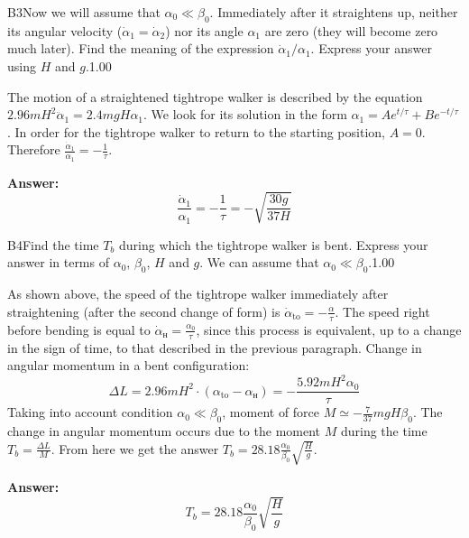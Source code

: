 \documentclass[11pt,a4paper]{article}
\begin{document}
\begin{solcard}{B3}{Now we will assume that $\alpha_0\ll{\beta_0}$. Immediately after it straightens up, neither its angular velocity ($\dot{\alpha}_1=\dot{\alpha}_2$) nor its angle $\alpha_1$ are zero (they will become zero much later). Find the meaning of the expression $\dot{\alpha}_1/\alpha_1$. Express your answer using $H$ and $g$.}{1.00}

The motion of a straightened tightrope walker is described by the equation $2.96mH^2 \ddot{\alpha}_1=2.4mgH\alpha_1$. We look for its solution in the form $\alpha_1=Ae^{t/\tau}+Be^{-t/\tau}$. In order for the tightrope walker to return to the starting position, $A=0$. Therefore $\frac{\dot{\alpha}_1}{\alpha_1} = - \frac{1}{\tau}$.

\par\smallskip\noindent\textbf{Answer:} \[\frac{\dot{\alpha}_1}{\alpha_1} = - \frac{1}{\tau}=-\sqrt{\frac{30g}{37H}}\]
\end{solcard}

\begin{solcard}{B4}{Find the time $T_b$ during which the tightrope walker is bent. Express your answer in terms of $\alpha_0$, $\beta_0$, $H$ and $g$. We can assume that $\alpha_0\ll{\beta_0}$.}{1.00}

As shown above, the speed of the tightrope walker immediately after straightening (after the second change of form) is $\dot{\alpha}_\text{to}=-\frac{\alpha}{\tau}$. The speed right before bending is equal to $\dot{\alpha}_\text{н}=\frac{\alpha_0}{\tau}$, since this process is equivalent, up to a change in the sign of time, to that described in the previous paragraph. Change in angular momentum in a bent configuration: \[\Delta L=2.96mH^2⋅(\alpha_\text{to}-\alpha_\text{н} )=-\frac{5.92mH^2 \alpha_0}{τ}\]Taking into account condition $\alpha_0 \ll \beta_0$, moment of force $M\simeq-\frac{7}{37} mgH\beta_0$. The change in angular momentum occurs due to the moment $M$ during the time $T_b=\frac{\Delta L}{M}$. From here we get the answer $T_b=28.18 \frac{\alpha_0}{\beta_0} \sqrt{\frac{H}{g}}$.

\par\smallskip\noindent\textbf{Answer:} \[T_b=28.18 \frac{\alpha_0}{\beta_0} \sqrt{\frac{H}{g}}\]
\end{solcard}
\end{document}

